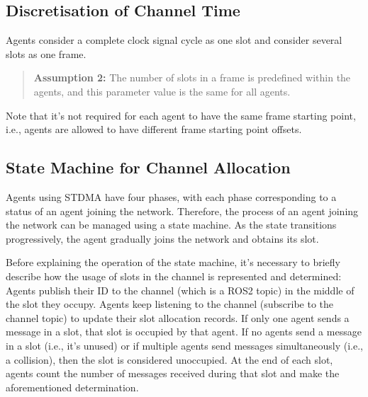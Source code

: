 \subsection{Discretisation of Channel Time}

Agents consider a complete clock signal cycle as one slot and consider several slots as one frame.

\begin{quotation}
    \textbf{Assumption 2:} 
    The number of slots in a frame is predefined within the agents, and this parameter value is the same for all agents.
\end{quotation}

Note that it's not required for each agent to have the same frame starting point, 
i.e., agents are allowed to have different frame starting point offsets.

\subsection{State Machine for Channel Allocation}

Agents using STDMA have four phases\cite{STDMA}, with each phase corresponding to a status of an agent joining the network. Therefore, the process of an agent joining the network can be managed using a state machine. As the state transitions progressively, the agent gradually joins the network and obtains its slot.

Before explaining the operation of the state machine, it's necessary to briefly describe how the usage of slots in the channel is represented and determined: 
Agents publish their ID to the channel (which is a ROS2 topic) in the middle of the slot they occupy.
Agents keep listening to the channel (subscribe to the channel topic) to update their slot allocation records. If only one agent sends a message in a slot, that slot is occupied by that agent. If no agents send a message in a slot (i.e., it's unused) or if multiple agents send messages simultaneously (i.e., a collision), then the slot is considered unoccupied.
At the end of each slot, agents count the number of messages received during that slot and make the aforementioned determination.


